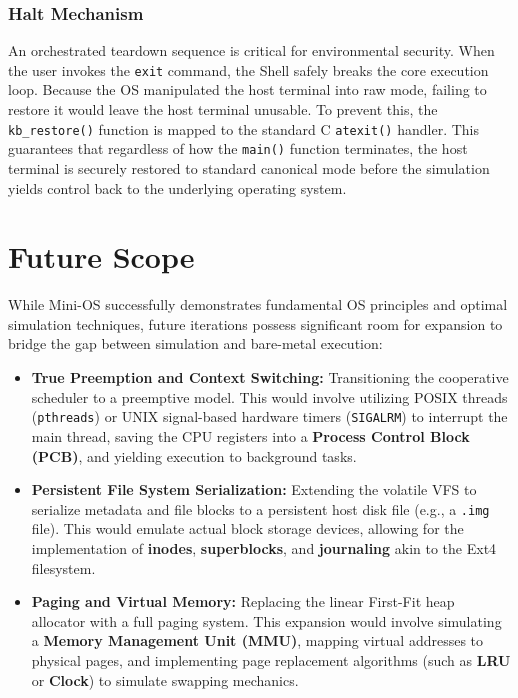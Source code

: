 \documentclass[conference]{IEEEtran}
\begin{document}
\subsubsection{\textbf{Halt Mechanism}}
An orchestrated teardown sequence is critical for environmental security. When the user invokes the \texttt{exit} command, the Shell safely breaks the core execution loop. Because the OS manipulated the host terminal into raw mode, failing to restore it would leave the host terminal unusable. To prevent this, the \texttt{kb\_restore()} function is mapped to the standard C \texttt{atexit()} handler. This guarantees that regardless of how the \texttt{main()} function terminates, the host terminal is securely restored to standard canonical mode before the simulation yields control back to the underlying operating system.

\section{Future Scope}
While Mini-OS successfully demonstrates fundamental OS principles and optimal simulation techniques, future iterations possess significant room for expansion to bridge the gap between simulation and bare-metal execution:
\begin{itemize}
    \item \textbf{True Preemption and Context Switching:} Transitioning the cooperative scheduler to a preemptive model. This would involve utilizing POSIX threads (\texttt{pthreads}) or UNIX signal-based hardware timers (\texttt{SIGALRM}) to interrupt the main thread, saving the CPU registers into a \textbf{Process Control Block (PCB)}, and yielding execution to background tasks.
    \item \textbf{Persistent File System Serialization:} Extending the volatile VFS to serialize metadata and file blocks to a persistent host disk file (e.g., a \texttt{.img} file). This would emulate actual block storage devices, allowing for the implementation of \textbf{inodes}, \textbf{superblocks}, and \textbf{journaling} akin to the Ext4 filesystem.
    \item \textbf{Paging and Virtual Memory:} Replacing the linear First-Fit heap allocator with a full paging system. This expansion would involve simulating a \textbf{Memory Management Unit (MMU)}, mapping virtual addresses to physical pages, and implementing page replacement algorithms (such as \textbf{LRU} or \textbf{Clock}) to simulate swapping mechanics.
\end{itemize}
\end{document}
